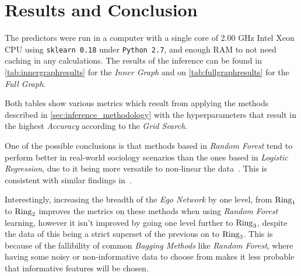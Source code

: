 \section{Results and Conclusion}
\label{sec:results}


The predictors were run in a computer with a single core of 2.00 GHz Intel Xeon CPU using \texttt{sklearn 0.18} under \texttt{Python 2.7}, and enough RAM to not need caching in any calculations. The results of the inference can be found in \cref{tab:innergraphresults} for the \emph{Inner Graph} and on \cref{tab:fullgraphresults} for the \emph{Full Graph}.


Both tables show various metrics which result from applying the methods described in \cref{sec:inference_methodology} with the hyperparameters that result in the highest \emph{Accuracy} according to the \emph{Grid Search}.

One of the possible conclusions is that methods based in \emph{Random Forest} tend to perform better in real-world sociology scenarios than the ones based in \emph{Logistic Regression}, due to it being more versatile to non-linear the data~\cite{logisticvsdecision}. This is consistent with similar findings in~\cite{muchlinski2016}.

Interestingly, increasing the breadth of the \emph{Ego Network} by one level, from $\operatorname{Ring}_1$ to $\operatorname{Ring}_2$ improves the metrics on these methods when using \emph{Random Forest} learning, however it isn't improved by going one level further to $\operatorname{Ring}_3$, despite the data of this being a strict superset of the previous on to $\operatorname{Ring}_3$. This is because of the fallibility of common \emph{Bagging Methods} like \emph{Random Forest}, where having some noisy or non-informative data to choose from makes it less probable that informative features will be chosen.

